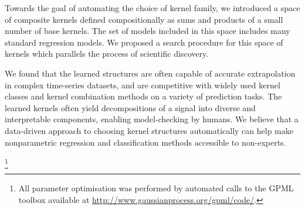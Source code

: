 %



Towards the goal of automating the choice of kernel family, we introduced a space of composite kernels defined compositionally as sums and products of a small number of base kernels.  
The set of models included in this space includes many standard regression models.
We proposed a search procedure for this space of kernels which parallels the process of scientific discovery.

We found that the learned structures are often capable of accurate extrapolation in complex time-series datasets, and are competitive with widely used kernel classes and kernel combination methods on a variety of prediction tasks.
The learned kernels often yield decompositions of a signal into diverse and interpretable components, enabling model-checking by humans.  %
We believe that a data-driven approach to choosing kernel structures automatically can help make nonparametric regression and classification methods accessible to non-experts.




\footnote{
All \gp{} parameter optimisation was performed by automated calls to the GPML toolbox available at \url{http://www.gaussianprocess.org/gpml/code/}.}



\outbpdocument{


}



